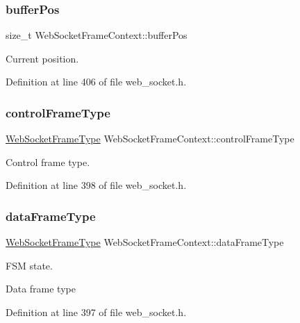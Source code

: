 \subsubsection{\texorpdfstring{buffer\+Pos}{bufferPos}}
{\footnotesize\ttfamily size\+\_\+t Web\+Socket\+Frame\+Context\+::buffer\+Pos}



Current position. 



Definition at line 406 of file web\+\_\+socket.\+h.

\mbox{\label{structWebSocketFrameContext_a7bb7a8727546244769ec56b41f991fee}} 
\subsubsection{\texorpdfstring{control\+Frame\+Type}{controlFrameType}}
{\footnotesize\ttfamily \hyperlink{web__socket_8h_a5cb4405f3460a36460b6ba588b60ea28}{Web\+Socket\+Frame\+Type} Web\+Socket\+Frame\+Context\+::control\+Frame\+Type}



Control frame type. 



Definition at line 398 of file web\+\_\+socket.\+h.

\mbox{\label{structWebSocketFrameContext_a036fe6609ab0425c8e56724c22e8760b}} 
\subsubsection{\texorpdfstring{data\+Frame\+Type}{dataFrameType}}
{\footnotesize\ttfamily \hyperlink{web__socket_8h_a5cb4405f3460a36460b6ba588b60ea28}{Web\+Socket\+Frame\+Type} Web\+Socket\+Frame\+Context\+::data\+Frame\+Type}



F\+SM state. 

Data frame type 

Definition at line 397 of file web\+\_\+socket.\+h.

